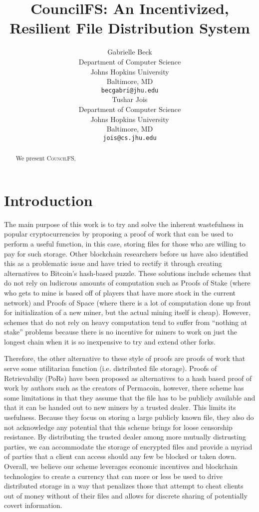 \documentclass{article}
\title{CouncilFS: An Incentivized, Resilient File Distribution System}
\author{
  Gabrielle Beck \\
  Department of Computer Science\\
  Johns Hopkins University \\
 Baltimore, MD \\
  \texttt{becgabri@jhu.edu} \\
   \And
 Tushar Jois \\
  Department of Computer Science\\
  Johns Hopkins University\\
  Baltimore, MD \\
  \texttt{jois@cs.jhu.edu} \\
}
\begin{document}
\maketitle

\begin{abstract}
  We present \textsc{CouncilFS},
\end{abstract}




\section{Introduction}

The main purpose of this work is to try and solve the inherent wastefulness in
popular cryptocurrencies by proposing a proof of work that can be used to
perform a useful function, in this case, storing files for those who are willing
to pay for such storage. Other blockchain researchers before us have also
identified this as a problematic issue and have tried to rectify it through
creating alternatives to Bitcoin’s hash-based puzzle. These solutions include
schemes that do not rely on ludicrous amounts of computation such as Proofs of
Stake (where who gets to mine is based off of players that have more stock in
the current network) and Proofs of Space (where there is a lot of computation
done up front for initialization of a new miner, but the actual mining itself is
cheap). However, schemes that do not rely on heavy computation tend to suffer
from “nothing at stake” problems because there is no incentive for miners to
work on just the longest chain when it is so inexpensive to try and extend other
forks.

Therefore, the other alternative to these style of proofs are proofs of
work that serve some utilitarian function (i.e. distributed file storage).
Proofs of Retrievabiliy (PoRs) have been proposed as alternatives to a hash
based proof of work by authors such as the creators of Permacoin, however, there
scheme has some limitations in that they assume that the file has to be publicly
available and that it can be handed out to new miners by a trusted dealer. This
limits its usefulness. Because they focus on storing a large publicly known
file, they also do not acknowledge any potential that this scheme brings for
loose censorship resistance. By distributing the trusted dealer among more
mutually distrusting parties, we can accommodate the storage of encrypted files
and provide a myriad of parties that a client can access should any few be
blocked or taken down. Overall, we believe our scheme leverages economic
incentives and blockchain technologies to create a currency that can more or
less be used to drive distributed storage in a way that penalizes those that
attempt to cheat clients out of money without of their files and allows for
discrete sharing of potentially covert information.
\end{document}
